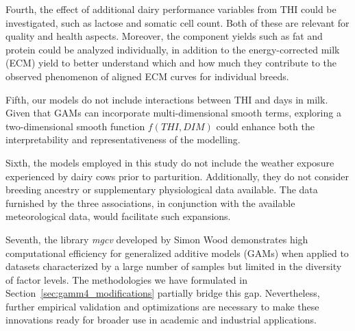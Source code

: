 \vspace*{\baselineskip}
Fourth, the effect of additional dairy performance variables from THI could be investigated, such as lactose and somatic cell count. Both of these are relevant for quality and health aspects. Moreover, the component yields such as fat and protein could be analyzed individually, in addition to the energy-corrected milk (ECM) yield to better understand which and how much they contribute to the observed phenomenon of aligned ECM curves for individual breeds.

\vspace*{\baselineskip}
Fifth, our models do not include interactions between THI and days in milk. Given that GAMs can incorporate multi-dimensional smooth terms, exploring a two-dimensional smooth function $f(THI, DIM)$ could enhance both the interpretability and representativeness of the modelling.

\vspace*{\baselineskip}
Sixth, the models employed in this study do not include the weather exposure experienced by dairy cows prior to parturition. Additionally, they do not consider breeding ancestry or supplementary physiological data available. The data furnished by the three associations, in conjunction with the available meteorological data, would facilitate such expansions.

\vspace*{\baselineskip}
Seventh, the library \textit{mgcv} developed by Simon Wood demonstrates high computational efficiency for generalized additive models (GAMs) when applied to datasets characterized by a large number of samples but limited in the diversity of factor levels. The methodologies we have formulated in Section~\ref{sec:gamm4_modifications} partially bridge this gap. Nevertheless, further empirical validation and optimizations are necessary to make these innovations ready for broader use in academic and industrial applications.